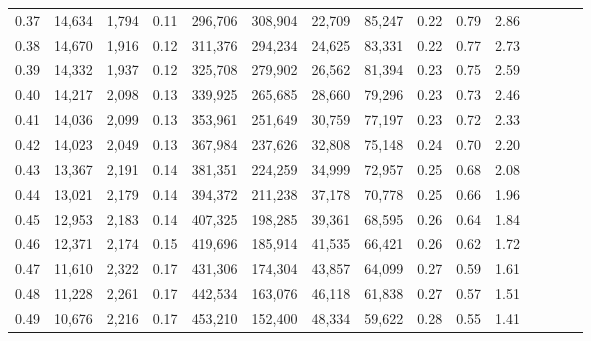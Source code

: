 \begin{tabular}{rrrcrrrrrrrrrrr}
0.37 &  14,634 &  1,794 &                                       0.11 &  296,706 &  308,904 &   22,709 &   85,247 &  0.22 &  0.79 &                         2.86 \\
0.38 &  14,670 &  1,916 &                                       0.12 &  311,376 &  294,234 &   24,625 &   83,331 &  0.22 &  0.77 &                         2.73 \\
0.39 &  14,332 &  1,937 &                                       0.12 &  325,708 &  279,902 &   26,562 &   81,394 &  0.23 &  0.75 &                         2.59 \\
0.40 &  14,217 &  2,098 &                                       0.13 &  339,925 &  265,685 &   28,660 &   79,296 &  0.23 &  0.73 &                         2.46 \\
0.41 &  14,036 &  2,099 &                                       0.13 &  353,961 &  251,649 &   30,759 &   77,197 &  0.23 &  0.72 &                         2.33 \\
0.42 &  14,023 &  2,049 &                                       0.13 &  367,984 &  237,626 &   32,808 &   75,148 &  0.24 &  0.70 &                         2.20 \\
0.43 &  13,367 &  2,191 &                                       0.14 &  381,351 &  224,259 &   34,999 &   72,957 &  0.25 &  0.68 &                         2.08 \\
0.44 &  13,021 &  2,179 &                                       0.14 &  394,372 &  211,238 &   37,178 &   70,778 &  0.25 &  0.66 &                         1.96 \\
0.45 &  12,953 &  2,183 &                                       0.14 &  407,325 &  198,285 &   39,361 &   68,595 &  0.26 &  0.64 &                         1.84 \\
0.46 &  12,371 &  2,174 &                                       0.15 &  419,696 &  185,914 &   41,535 &   66,421 &  0.26 &  0.62 &                         1.72 \\
0.47 &  11,610 &  2,322 &                                       0.17 &  431,306 &  174,304 &   43,857 &   64,099 &  0.27 &  0.59 &                         1.61 \\
0.48 &  11,228 &  2,261 &                                       0.17 &  442,534 &  163,076 &   46,118 &   61,838 &  0.27 &  0.57 &                         1.51 \\
0.49 &  10,676 &  2,216 &                                       0.17 &  453,210 &  152,400 &   48,334 &   59,622 &  0.28 &  0.55 &                         1.41 \\

\end{tabular}
